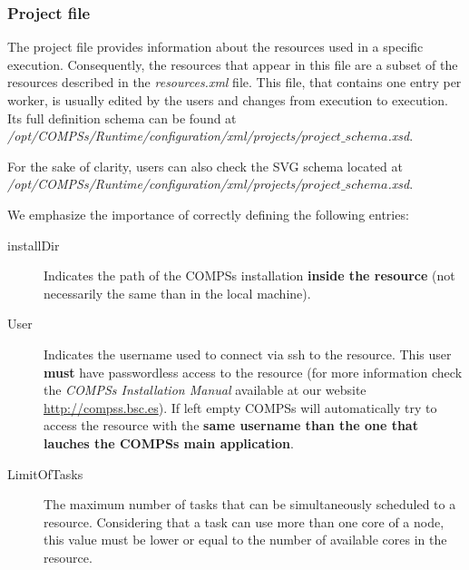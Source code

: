 \subsubsection{Project file}
The project file provides information about the resources used in a specific execution. Consequently, the resources that 
appear in this file are a subset of the resources described in the \textit{resources.xml} file. This file, that contains
one entry per worker, is usually edited by the users and changes from execution to execution. Its full definition 
schema can be found at\\ 
\emph{/opt/COMPSs/Runtime/configuration/xml/projects/$project\_schema$.xsd}.

For the sake of clarity, users can also check the SVG schema located at \\
\emph{/opt/COMPSs/Runtime/configuration/xml/projects/$project\_schema$.xsd}.

We emphasize the importance of correctly defining the following entries:
\begin{description}
 \item [installDir] Indicates the path of the COMPSs installation \textbf{inside the resource} (not necessarily the same 
 than in the local machine).
 \item [User] Indicates the username used to connect via ssh to the resource. This user \textbf{must} have passwordless access to the
 resource (for more information check the \textit{COMPSs Installation Manual} available at our website \url{http://compss.bsc.es}).
 If left empty COMPSs will automatically try to access the resource with the \textbf{same username than the one that lauches 
 the COMPSs main application}.
 \item [LimitOfTasks] The maximum number of tasks that can be simultaneously scheduled to a resource. Considering that a task 
 can use more than one core of a node, this value must be lower or equal to the number of available cores in the resource. 
\end{description}


